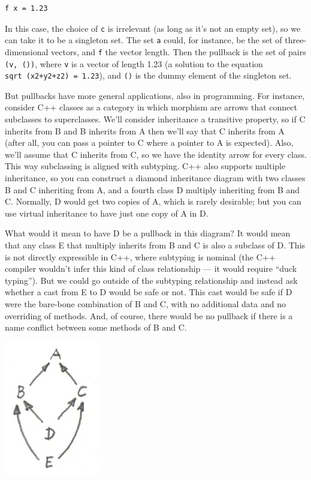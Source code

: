 \begin{verbatim}
f x = 1.23
\end{verbatim}

In this case, the choice of \texttt{c} is irrelevant (as long as it's
not an empty set), so we can take it to be a singleton set. The set
\texttt{a} could, for instance, be the set of three-dimensional vectors,
and \texttt{f} the vector length. Then the pullback is the set of pairs
\texttt{(v,\ ())}, where \texttt{v} is a vector of length 1.23 (a
solution to the equation \texttt{sqrt\ (x2+y2+z2)\ =\ 1.23}), and
\texttt{()} is the dummy element of the singleton set.

But pullbacks have more general applications, also in programming. For
instance, consider C++ classes as a category in which morphism are
arrows that connect subclasses to superclasses. We'll consider
inheritance a transitive property, so if C inherits from B and B
inherits from A then we'll say that C inherits from A (after all, you
can pass a pointer to C where a pointer to A is expected). Also, we'll
assume that C inherits from C, so we have the identity arrow for every
class. This way subclassing is aligned with subtyping. C++ also supports
multiple inheritance, so you can construct a diamond inheritance diagram
with two classes B and C inheriting from A, and a fourth class D
multiply inheriting from B and C. Normally, D would get two copies of A,
which is rarely desirable; but you can use virtual inheritance to have
just one copy of A in D.

What would it mean to have D be a pullback in this diagram? It would
mean that any class E that multiply inherits from B and C is also a
subclass of D. This is not directly expressible in C++, where subtyping
is nominal (the C++ compiler wouldn't infer this kind of class
relationship --- it would require ``duck typing''). But we could go
outside of the subtyping relationship and instead ask whether a cast
from E to D would be safe or not. This cast would be safe if D were the
bare-bone combination of B and C, with no additional data and no
overriding of methods. And, of course, there would be no pullback if
there is a name conflict between some methods of B and C.

\includegraphics[width=1.61458in]{images/classes.jpg}

